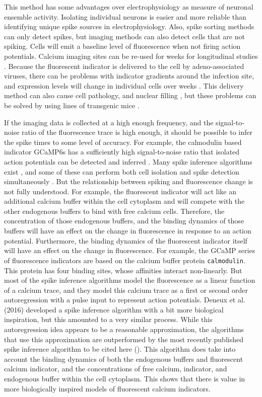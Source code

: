 This method has some advantages over electrophysiology as measure of neuronal ensemble activity. Isolating individual neurons is easier and more reliable than identifying unique spike sources in electrophysiology. Also, spike sorting methods can only detect spikes, but imaging methods can also detect cells that are not spiking. Cells will emit a baseline level of fluorescence when not firing action potentials. Calcium imaging sites can be re-used for weeks for longitudinal studies \parencite{chen}. Because the fluorescent indicator is delivered to the cell by adeno-associated viruses, there can be problems with indicator gradients around the infection site, and expression levels will change in individual cells over weeks \parencite{tian, chen}. This delivery method can also cause cell pathology, and nuclear filling \parencite{zariwala}, but these problems can be solved by using lines of transgenic mice \parencite{dana}.

If the imaging data is collected at a high enough frequency, and the signal-to-noise ratio of the fluorescence trace is high enough, it should be possible to infer the spike times to some level of accuracy. For example, the calmodulin based indicator GCaMP6s has a sufficiently high signal-to-noise ratio that isolated action potentials can be detected and inferred \parencite{chen}. Many spike inference algorithms exist \parencite{vogelstein, pnevmatikakis, friedrich, paninski1, paninski2, deneux, greenberg}, and some of these can perform both cell isolation and spike detection simultaneously \parencite{vogelstein, pnevmatikakis, paninski2, deneux}. But the relationship between spiking and fluorescence change is not fully understood. For example, the fluorescent indicator will act like an additional calcium buffer within the cell cytoplasm and will compete with the other endogenous buffers to bind with free calcium cells. Therefore, the concentration of those endogenous buffers, and the binding dynamics of those buffers will have an effect on the change in fluorescence in response to an action potential. Furthermore, the binding dynamics of the fluorescent indicator itself will have an effect on the change in fluorescence. For example, the GCaMP series of fluorescence indicators are based on the calcium buffer protein \texttt{calmodulin}. This protein has four binding sites, whose affinities interact non-linearly. But most of the spike inference algorithms model the fluorescence as a linear function of a calcium trace, and they model this calcium trace as a first or second order autoregression with a pulse input to represent action potentials. Deneux et al. (2016) developed a spike inference algorithm with a bit more biological inspiration, but this amounted to a very similar process. While this autoregression idea appears to be a reasonable approximation, the algorithms that use this approximation are outperformed by the most recently published spike inference algorithm to be cited here (\parencite{greenberg}). This algorithm does take into account the binding dynamics of both the endogenous buffers and fluorescent calcium indicator, and the concentrations of free calcium, indicator, and endogenous buffer within the cell cytoplasm. This shows that there is value in more biologically inspired models of fluorescent calcium indicators.

